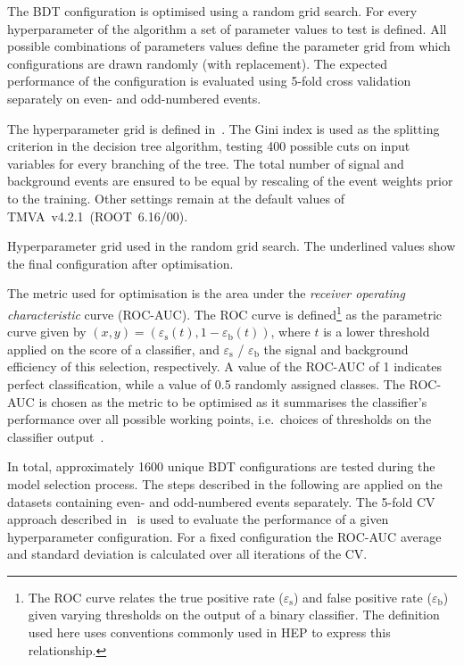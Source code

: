 The BDT configuration is optimised using a random grid search. For
every hyperparameter of the algorithm a set of parameter values to
test is defined. All possible combinations of parameters values define
the parameter grid from which configurations are drawn randomly (with
replacement). The expected performance of the configuration is
evaluated using 5-fold cross validation separately on even- and
odd-numbered events.

The hyperparameter grid is defined
in~. The Gini index is used as the
splitting criterion in the decision tree algorithm, testing 400
possible cuts on input variables for every branching of the tree. The
total number of signal and background events are ensured to be equal
by rescaling of the event weights prior to the training. Other
settings remain at the default values of TMVA~v4.2.1~(ROOT~6.16/00).

\begin{table}[htbp]
  \centering
  
  \caption{Hyperparameter grid used in the random grid search. The
    underlined values show the final configuration after
    optimisation.}
  \label{tab:hyperparameter_grid_bdt}
\end{table}

The metric used for optimisation is the area under the \emph{receiver
  operating characteristic} curve (ROC-AUC). The ROC curve is
defined\footnote{The ROC curve relates the true positive rate
  ($\varepsilon_\text{s}$) and false positive rate
  ($\varepsilon_\text{b}$) given varying thresholds on the output of a
  binary classifier. The definition used here uses conventions
  commonly used in HEP to express this relationship.} as the
parametric curve given by
$(x, y) = \left( \varepsilon_{\text{s}}(t), 1 -
  \varepsilon_{\text{b}}(t) \right)$, where $t$ is a lower threshold
applied on the score of a classifier, and $\varepsilon_\text{s}$ /
$\varepsilon_\text{b}$ the signal and background efficiency of this
selection, respectively. A value of the ROC-AUC of 1 indicates perfect
classification, while a value of 0.5 randomly assigned classes. The
ROC-AUC is chosen as the metric to be optimised as it summarises the
classifier's performance over all possible working points,
i.e.~choices of thresholds on the classifier output~\cite{james13}.

In total, approximately 1600 unique BDT configurations are tested
during the model selection process. The steps described in the
following are applied on the datasets containing even- and
odd-numbered events separately. The 5-fold CV approach described
in~ is used to evaluate the performance
of a given hyperparameter configuration. For a fixed configuration the
ROC-AUC average and standard deviation is calculated over all
iterations of the CV.

